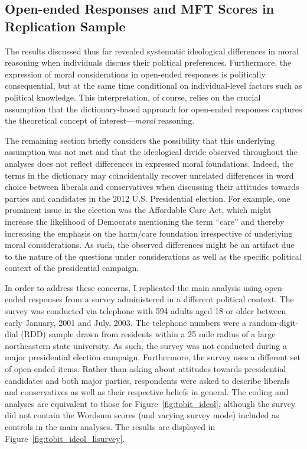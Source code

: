 \documentclass[12pt]{article}
\begin{document}
\clearpage
\subsection{Open-ended Responses and MFT Scores in Replication Sample}

The results discussed thus far revealed systematic ideological differences in moral reasoning when individuals discuss their political preferences. Furthermore, the expression of moral considerations in open-ended responses is politically consequential, but at the same time conditional on individual-level factors such as political knowledge. This interpretation, of course, relies on the crucial assumption that the dictionary-based approach for open-ended responses captures the theoretical concept of interest---\textit{moral} reasoning.

The remaining section briefly considers the possibility that this underlying assumption was not met and that the ideological divide observed throughout the analyses does not reflect differences in expressed moral foundations. Indeed, the terms in the dictionary may coincidentally recover unrelated differences in word choice between liberals and conservatives when discussing their attitudes towards parties and candidates in the 2012 U.S. Presidential election. For example, one prominent issue in the election was the Affordable Care Act, which might increase the likelihood of Democrats mentioning the term ``care'' and thereby increasing the emphasis on the harm/care foundation irrespective of underlying moral considerations. As such, the observed differences might be an artifact due to the nature of the questions under considerations as well as the specific political context of the presidential campaign.

In order to address these concerns, I replicated the main analysis using open-ended responses from a survey administered in a different political context. The survey was conducted via telephone with 594 adults aged 18 or older between early January, 2001 and July, 2003. The telephone numbers were a random-digit-dial (RDD) sample drawn from residents within a 25 mile radius of a large northeastern state university. As such, the survey was not conducted during a  major presidential election campaign. Furthermore, the survey uses a different set of open-ended items. Rather than asking about attitudes towards presidential candidates and both major parties, respondents were asked to describe liberals and conservatives as well as their respective beliefs in general. The coding and analyses are equivalent to those for Figure~\ref{fig:tobit_ideol}, although the survey did not contain the Wordsum scores (and varying survey mode) included as controls in the main analyses. The results are displayed in Figure~\ref{fig:tobit_ideol_lisurvey}.
\end{document}
